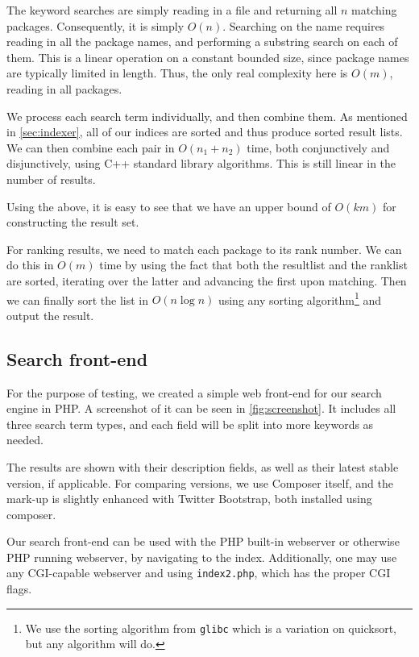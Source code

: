 \documentclass{article}
\begin{document}
The keyword searches are simply reading in a file and returning all $n$ matching packages. Consequently, it is simply $O(n)$. Searching on the name requires reading in all the package names, and performing a substring search on each of them. This is a linear operation on a constant bounded size, since package names are typically limited in length. Thus, the only real complexity here is $O(m)$, reading in all packages.

We process each search term individually, and then combine them. As mentioned in \autoref{sec:indexer}, all of our indices are sorted and thus produce sorted result lists. We can then combine each pair in $O(n_1 + n_2)$ time, both conjunctively and disjunctively, using C++ standard library algorithms. This is still linear in the number of results.

Using the above, it is easy to see that we have an upper bound of $O(km)$ for constructing the result set.

For ranking results, we need to match each package to its rank number. We can do this in $O(m)$ time by using the fact that both the resultlist and the ranklist are sorted, iterating over the latter and advancing the first upon matching. Then we can finally sort the list in $O(n \log n)$ using any sorting algorithm\footnote{We use the sorting algorithm from \texttt{glibc} which is a variation on quicksort, but any algorithm will do.} and output the result.

\subsection{Search front-end}

For the purpose of testing, we created a simple web front-end for our search engine in PHP. A screenshot of it can be seen in \autoref{fig:screenshot}. It includes all three search term types, and each field will be split into more keywords as needed.

The results are shown with their description fields, as well as their latest stable version, if applicable. For comparing versions, we use Composer itself, and the mark-up is slightly enhanced with Twitter Bootstrap, both installed using composer.

Our search front-end can be used with the PHP built-in webserver or otherwise PHP running webserver, by navigating to the index. Additionally, one may use any CGI-capable webserver and using \texttt{index2.php}, which has the proper CGI flags.
\end{document}
